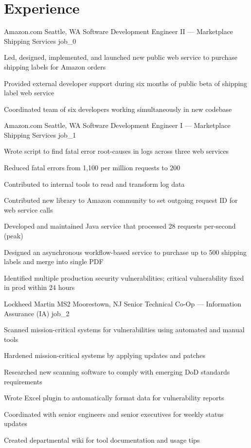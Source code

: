 \documentclass[10pt]{barag_resume}
\author{Sean Barag}
\begin{document}
\section{Experience}\relax
    \renewcommand{\labelitemi}{$\cdot$}\relax %
    \begin{job}{Amazon.com}
        {Seattle, WA}
        {Software Development Engineer II --- Marketplace Shipping Services}
        {job_0}
            \item Led, designed, implemented, and launched new public web service to purchase shipping labels for Amazon orders
            \item Provided external developer support during six months of public beta of shipping label web service
            \item Coordinated team of six developers working simultaneously in new codebase
    \end{job}

    \begin{job}{Amazon.com}
        {Seattle, WA}
        {Software Development Engineer I --- Marketplace Shipping Services}
        {job_1}
            \item Wrote script to find fatal error root-causes in logs across three web services
            \item Reduced fatal errors from 1,100 per million requests to 200
            \item Contributed to internal tools to read and transform log data
            \item Contributed new library to Amazon community to set outgoing request ID for web service calls
            \item Developed and maintained Java service that processed 28 requests per-second (peak)
            \item Designed an asynchronous workflow-based service to purchase up to 500 shipping labels and merge into single PDF
            \item Identified multiple production security vulnerabilities; critical vulnerability fixed in prod within 24 hours
    \end{job}

    \begin{job}{Lockheed Martin MS2}
        {Moorestown, NJ}
        {Senior Technical Co-Op --- Information Assurance (IA)}
        {job_2}
            \item Scanned mission-critical systems for vulnerabilities using automated and manual tools
            \item Hardened mission-critical systems by applying updates and patches
            \item Researched new scanning software to comply with emerging DoD standards requirements
            \item Wrote Excel plugin to automatically format data for vulnerability reports
            \item Coordinated with senior engineers and senior executives for weekly status updates
            \item Created departmental wiki for tool documentation and usage tips
    \end{job}
\end{document}
